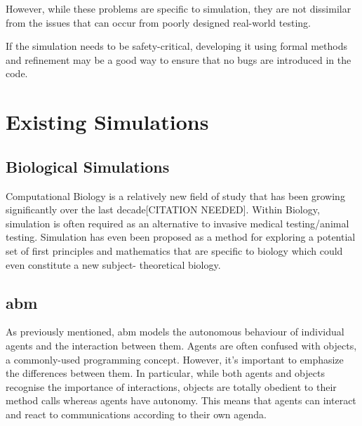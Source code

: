 \documentclass{UoYCSproject}
\begin{document}
However, while these problems are specific to simulation, they are not dissimilar from the issues that can occur from poorly designed real-world testing.

If the simulation needs to be safety-critical, developing it using formal methods and refinement may be a good way to ensure that no bugs are introduced in the code.

\section{Existing Simulations}

\subsection{Biological Simulations}
Computational Biology is a relatively new field of study that has been growing significantly over the last decade[CITATION NEEDED].
Within Biology, simulation is often required as an alternative to invasive medical testing/animal testing.%
Simulation has even been proposed as a method for exploring a potential set of first principles and mathematics that are specific to biology which could even constitute a new subject- theoretical biology\cite{rise_article}.

\subsection{\acrlong{abm}}
\label{abm}
As previously mentioned, \gls{abm} models the autonomous behaviour of individual agents and the interaction between them.
Agents are often confused with objects, a commonly-used programming concept.
However, it's important to emphasize the differences between them.
In particular, while both agents and objects recognise the importance of interactions, objects are totally obedient to their method calls whereas agents have autonomy.
This means that agents can interact and react to communications according to their own agenda.
\end{document}
